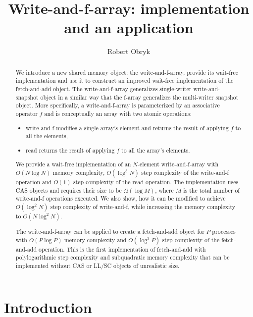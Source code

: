 \documentclass[a4paper,11pt]{article}
\author{Robert Obryk}
\title{Write-and-f-array: implementation and an application}
\date{}
\begin{document}
\maketitle
\begin{abstract}
	We introduce a new shared memory object: the write-and-f-array, provide its wait-free implementation and use it to construct an improved wait-free implementation of the fetch-and-add object. The write-and-f-array generalizes single-writer write-and-snapshot\cite{write-and-snap} object in a similar way that the f-array\cite{f-array} generalizes the multi-writer snapshot object. More specifically, a write-and-f-array is parameterized by an associative operator $f$ and is conceptually an array with two atomic operations:

\begin{itemize}
\item write-and-f modifies a single array's element and returns the result of applying $f$ to all the elements,
\item read returns the result of applying $f$ to all the array's elements.
\end{itemize}

We provide a wait-free implementation of an $N$-element write-and-f-array with $O(N \log N)$ memory complexity, $O(\log^3 N)$ step complexity of the write-and-f operation and $O(1)$ step complexity of the read operation. The implementation uses CAS objects and requires their size to be $\Omega(\log M)$, where $M$ is the total number of write-and-f operations executed. We also show, how it can be modified to achieve $O(\log^2 N)$ step complexity of write-and-f, while increasing the memory complexity to $O(N \log^2 N)$.

The write-and-f-array can be applied to create a fetch-and-add object for $P$ processes with $O(P \log P)$ memory complexity and $O(\log^3 P)$ step complexity of the fetch-and-add operation. This is the first implementation of fetch-and-add with polylogarithmic step complexity and subquadratic memory complexity that can be implemented without CAS or LL/SC objects of unrealistic size\cite{ellen-fai}.
\end{abstract}
\clearpage
\tableofcontents
\clearpage
\section{Introduction}
\end{document}
